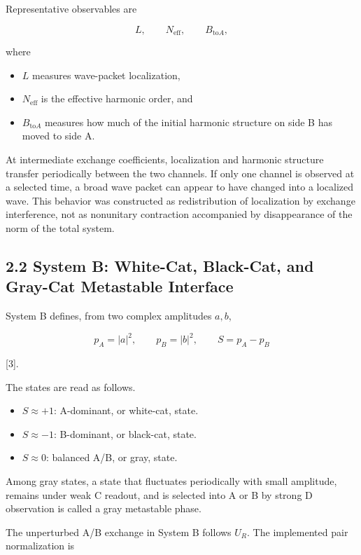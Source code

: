 \documentclass[
  a4paper,
  10pt]{article}
\providecommand{\tightlist}{%
  \setlength{\itemsep}{0pt}\setlength{\parskip}{0pt}}
\begin{document}
Representative observables are

\[
L,
\qquad
N_{\mathrm{eff}},
\qquad
B_{\mathrm{to}A},
\]

where

\begin{itemize}
\tightlist
\item
  \(L\) measures wave-packet localization,
\item
  \(N_{\mathrm{eff}}\) is the effective harmonic order, and
\item
  \(B_{\mathrm{to}A}\) measures how much of the initial harmonic
  structure on side B has moved to side A.
\end{itemize}

At intermediate exchange coefficients, localization and harmonic
structure transfer periodically between the two channels. If only one
channel is observed at a selected time, a broad wave packet can appear
to have changed into a localized wave. This behavior was constructed as
redistribution of localization by exchange interference, not as
nonunitary contraction accompanied by disappearance of the norm of the
total system.

\subsection{2.2 System B: White-Cat, Black-Cat, and Gray-Cat Metastable
Interface}\label{22-system-b-white-cat-black-cat-and-gray-cat-metastable-interface}

System B defines, from two complex amplitudes \(a,b\),

\[
p_A=|a|^2,
\qquad
p_B=|b|^2,
\qquad
S=p_A-p_B
\]

{[}3{]}.

The states are read as follows.

\begin{itemize}
\tightlist
\item
  \(S\approx+1\): A-dominant, or white-cat, state.
\item
  \(S\approx-1\): B-dominant, or black-cat, state.
\item
  \(S\approx0\): balanced A/B, or gray, state.
\end{itemize}

Among gray states, a state that fluctuates periodically with small
amplitude, remains under weak C readout, and is selected into A or B by
strong D observation is called a gray metastable phase.

The unperturbed A/B exchange in System B follows \(U_R\). The
implemented pair normalization is
\end{document}
